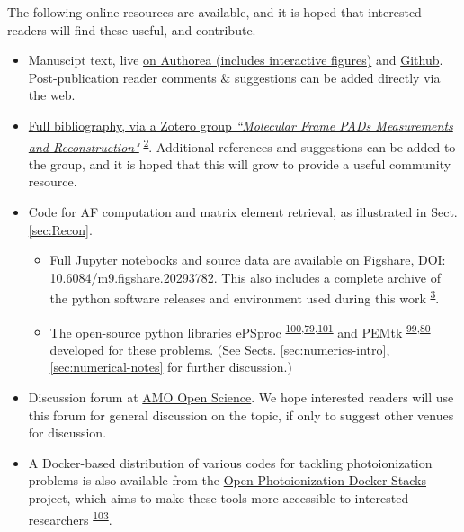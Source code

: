 \documentclass[10pt]{article}
\begin{document}
The following online resources are available, and it is hoped that interested readers will find these useful, and contribute.

\begin{itemize}
\item Manuscipt text, live \href{https://www.authorea.com/users/71114/articles/447808-extracting-molecular-frame-photoionization-dynamics-from-experimental-data}{on Authorea (includes interactive figures)} and \href{https://github.com/phockett/Extracting-Molecular-Frame-Photoionization-Dynamics-from-Experimental-Data}{Github}. Post-publication reader comments \& suggestions can be added directly via the web.
\item \href{https://www.zotero.org/groups/4733878/molecular_frame_pads_measurements_and_reconstruction}{Full bibliography, via a Zotero group \textit{``Molecular Frame PADs Measurements and Reconstruction"}} \textsuperscript{\hyperref[csl:2]{2}}. Additional references and suggestions can be added to the group, and it is hoped that this will grow to provide a useful community resource.
\item Code for AF computation and matrix element retrieval, as illustrated in Sect. \ref{sec:Recon}. 
\begin{itemize}
\item Full Jupyter notebooks and source data are \href{http://dx.doi.org/10.6084/m9.figshare.20293782}{available on Figshare, DOI: 10.6084/m9.figshare.20293782}. This also includes a complete archive of the python software releases and environment used during this work \textsuperscript{\hyperref[csl:3]{3}}.
\item The open-source python libraries \href{https://epsproc.readthedocs.io}{ePSproc} \textsuperscript{\hyperref[csl:100]{100},\hyperref[csl:79]{79},\hyperref[csl:101]{101}} and \href{https://pemtk.readthedocs.io}{PEMtk} \textsuperscript{\hyperref[csl:99]{99},\hyperref[csl:80]{80}} developed for these problems. (See Sects. \ref{sec:numerics-intro}, \ref{sec:numerical-notes} for further discussion.)
\end{itemize}
\item Discussion forum at \href{https://amoopenscience.femtolab.ca/}{AMO Open Science}. We hope interested readers will use this forum for general discussion on the topic, if only to suggest other venues for discussion.
\item A Docker-based distribution of various codes for tackling photoionization problems is also available from the \href{https://github.com/phockett/open-photoionization-docker-stacks}{Open Photoionization Docker Stacks} project, which aims to make these tools more accessible to interested researchers \textsuperscript{\hyperref[csl:103]{103}}.
\end{itemize}
\end{document}
